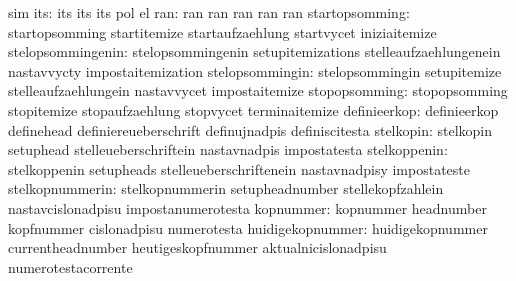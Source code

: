                                   sim
                             its: its                              its
                                  its                              pol %
                                  el %
                             ran: ran                              ran
                                  ran                              ran
                                  ran
                  startopsomming: startopsomming                   startitemize
                                  startaufzaehlung                 startvycet
                                  iniziaitemize                    %
               stelopsommingenin: stelopsommingenin                setupitemizations
                                  stelleaufzaehlungenein           nastavvycty
                                  impostaitemization
                 stelopsommingin: stelopsommingin                  setupitemize
                                  stelleaufzaehlungein             nastavvycet
                                  impostaitemize
                   stopopsomming: stopopsomming                    stopitemize
                                  stopaufzaehlung                  stopvycet
                                  terminaitemize
                    definieerkop: definieerkop                     definehead
                                  definiereueberschrift            definujnadpis
                                  definiscitesta                   %
                       stelkopin: stelkopin                        setuphead
                                  stelleueberschriftein            nastavnadpis
                                  impostatesta
                    stelkoppenin: stelkoppenin                     setupheads
                                  stelleueberschriftenein          nastavnadpisy
                                  impostateste
                 stelkopnummerin: stelkopnummerin                  setupheadnumber
                                  stellekopfzahlein                nastavcislonadpisu
                                  impostanumerotesta
                       kopnummer: kopnummer                        headnumber
                                  kopfnummer                       cislonadpisu
                                  numerotesta
                huidigekopnummer: huidigekopnummer                 currentheadnumber
                                  heutigeskopfnummer               aktualnicislonadpisu
                                  numerotestacorrente
